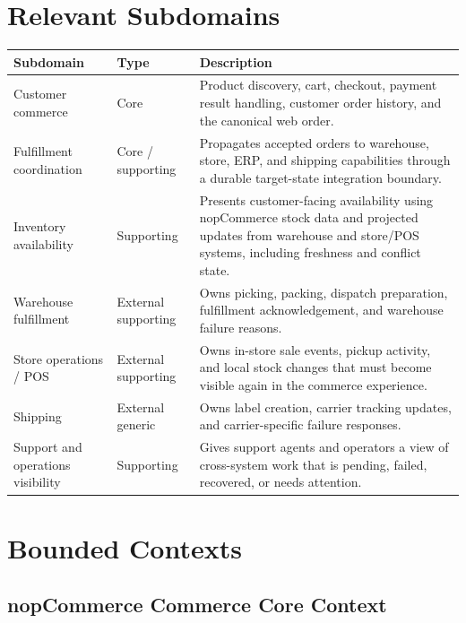 \section{Relevant Subdomains}

\begingroup
\small
\setlength{\tabcolsep}{4pt}
\renewcommand{\arraystretch}{1.15}
\begin{center}
\begin{tabular}{|p{}|p{}|p{}|}
\hline
\textbf{Subdomain} & \textbf{Type} & \textbf{Description} \\
\hline
Customer commerce & Core & Product discovery, cart, checkout, payment result handling, customer order history, and the canonical web order. \\
\hline
Fulfillment coordination & Core / supporting & Propagates accepted orders to warehouse, store, ERP, and shipping capabilities through a durable target-state integration boundary. \\
\hline
Inventory availability & Supporting & Presents customer-facing availability using nopCommerce stock data and projected updates from warehouse and store/POS systems, including freshness and conflict state. \\
\hline
Warehouse fulfillment & External supporting & Owns picking, packing, dispatch preparation, fulfillment acknowledgement, and warehouse failure reasons. \\
\hline
Store operations / POS & External supporting & Owns in-store sale events, pickup activity, and local stock changes that must become visible again in the commerce experience. \\
\hline
Shipping & External generic & Owns label creation, carrier tracking updates, and carrier-specific failure responses. \\
\hline
Support and operations visibility & Supporting & Gives support agents and operators a view of cross-system work that is pending, failed, recovered, or needs attention. \\
\hline
\end{tabular}
\end{center}
\endgroup

\section{Bounded Contexts}

\subsection{nopCommerce Commerce Core Context}

